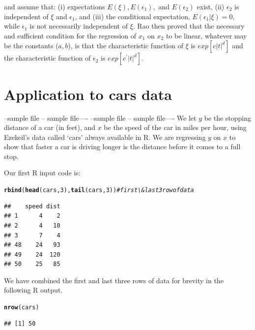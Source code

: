 \documentclass[12pt]{article}\usepackage[]{graphicx}\usepackage[]{color}
\makeatletter
\newcommand{\hlnum}[1]{\textcolor[rgb]{0.686,0.059,0.569}{#1}}%
\newcommand{\hlcom}[1]{\textcolor[rgb]{0.678,0.584,0.686}{\textit{#1}}}%
\newcommand{\hlstd}[1]{\textcolor[rgb]{0.345,0.345,0.345}{#1}}%
\newcommand{\hlkwd}[1]{\textcolor[rgb]{0.737,0.353,0.396}{\textbf{#1}}}%
\newenvironment{kframe}{%
 \def\at@end@of@kframe{}%
 \ifinner\ifhmode%
  \def\at@end@of@kframe{\end{minipage}}%
  \begin{minipage}{\columnwidth}%
 \fi\fi%
 \def\FrameCommand##1{\hskip\@totalleftmargin \hskip-\fboxsep
 \colorbox{shadecolor}{##1}\hskip-\fboxsep
     \hskip-\linewidth \hskip-\@totalleftmargin \hskip\columnwidth}%
 \MakeFramed {\advance\hsize-\width
   \@totalleftmargin\z@ \linewidth\hsize
   \@setminipage}}%
 {\par\unskip\endMakeFramed%
 \at@end@of@kframe}
\newenvironment{knitrout}{}{} %
\makeatother
\begin{document}
\cite{Rao47} and \cite{Rao49} 
assume that: (i) expectations $E(\xi), E(\epsilon_1),$ 
and $E(\epsilon_2)$ exist, (ii) $\epsilon_2$ is independent of $\xi$ and $\epsilon_1$,
and (iii) the conditional expectation, $E(\epsilon_1 |\xi)=0$, while $\epsilon_1$ is not necessarily
independent of $\xi$.  Rao then proved that
the necessary and sufficient condition for
the regression of $x_1$ on
$x_2$ to be linear, whatever may be the constants ($a, b$), is that
the characteristic function of  $\xi$ is $exp[c|t|^d]$ 
and the characteristic function of  $\epsilon_2$ is $exp[c^\prime|t|^d]$.

\section{Application to cars data}
--sample file -- sample file----
--sample file -- sample file----
We let $y$ be the stopping distance of a car (in feet),
and $x$ be the speed of the car in miles per hour, using 
Ezekeil's data called `cars' always available in R. 
We are regressing $y$ on $x$ to show that faster a car is driving
longer is the distance before it comes to a full stop.

Our first R input code is:

\begin{knitrout}
\color{fgcolor}\begin{kframe}
\begin{alltt}
\hlkwd{rbind}\hlstd{(}\hlkwd{head}\hlstd{(cars,}\hlnum{3}\hlstd{),}\hlkwd{tail}\hlstd{(cars,}\hlnum{3}\hlstd{))} \hlcom{# first \textbackslash{}& last 3 row of data}
\end{alltt}
\begin{verbatim}
##    speed dist
## 1      4    2
## 2      4   10
## 3      7    4
## 48    24   93
## 49    24  120
## 50    25   85
\end{verbatim}
\end{kframe}
\end{knitrout}

We have combined the first and last three rows of data for brevity in
the following R output.

\begin{knitrout}
\color{fgcolor}\begin{kframe}
\begin{alltt}
\hlkwd{nrow}\hlstd{(cars)}
\end{alltt}
\begin{verbatim}
## [1] 50
\end{verbatim}
\end{kframe}
\end{knitrout}
\end{document}
